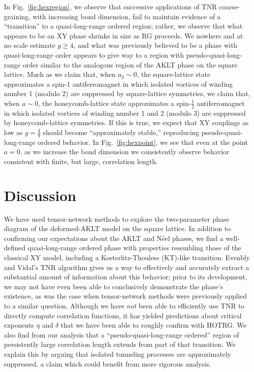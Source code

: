 \documentclass[aps,prb,letterpaper,superscriptaddress,twocolumn,showpacs,floatfix,10pt]{revtex4-1}
\begin{document}
In Fig.~\ref{fig:hexregion}, we observe that successive applications
of TNR coarse-graining, with increasing bond dimension, fail to maintain
evidence of a ``transition'' to a quasi-long-range ordered region; rather,
we observe that what appears to be an XY phase shrinks in size as
RG proceeds. We nowhere and at no scale estimate $g\geq 4$, and what
was previously believed to be a phase with quasi-long-range order appears to
give way to a region with pseudo-quasi-long-range order similar to the
analogous region of the AKLT phase on the square lattice. Much as we claim
that, when $a_2\sim 0$, the square-lattice state approximates a spin-1
antiferromagnet in which isolated vortices of winding number 1 (modulo 2) are
suppressed by square-lattice symmetries, we claim that, when $a\sim 0$,
the honeycomb-lattice state approximates a spin-$\frac{1}{2}$ antiferromagnet
in which isolated vortices of winding number 1 and 2 (modulo 3) are
suppressed by honeycomb-lattice symmetries. If this is true, we expect
that XY couplings as low as $g=\frac{4}{9}$ should become ``approximately
stable,'' reproducing pseudo-quasi-long-range ordered behavior. 
In Fig.~\ref{fig:hexpoint}, we see that even at the point $a=0$, as we increase
the bond dimension we consistently observe behavior
consistent with finite, but large, correlation length.


\section{Discussion} \label{sec:Conclusion} 
We have used tensor-network methods to explore the two-parameter phase diagram
of the deformed-AKLT model on the square lattice. In addition to confirming
our expectations about the AKLT and N\'eel phases, we find a well-defined
quasi-long-range ordered phase with properties resembling those of the classical
XY model, including a Kosterlitz-Thouless (KT)-like transition.
Evenbly and Vidal's
TNR algorithm\cite{TNR} gives us a way to effectively and accurately extract a
substantial amount of information about this behavior; prior to its
development, we may not have even been able to conclusively demonstrate the
phase's existence, as was the case when tensor-network methods were previously
applied to a similar question.\cite{AKLTspin32}
Although we have \textit{not} been
able to efficiently use TNR to directly compute correlation functions, it has
yielded predictions about critical exponents $\eta$ and $\delta$ that we
have been able to roughly confirm with HOTRG. We also find from our
analysis that a ``pseudo-quasi-long-range ordered'' region of persistently large
correlation length extends from part of that transition. We explain this
by arguing that isolated tunneling processes are approximately suppressed,
a claim which could benefit from more rigorous analysis.
\end{document}
